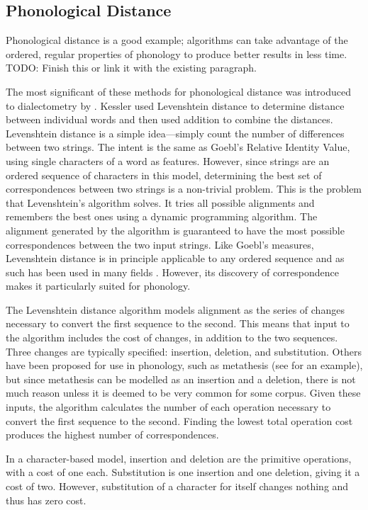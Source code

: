 \documentclass[11pt]{article}
\begin{document}
\subsection{Phonological Distance}

Phonological distance is a good example; algorithms can take advantage
of the ordered, regular properties of phonology to produce better
results in less time. TODO: Finish this or link it with the existing
paragraph.

The most significant of these methods for phonological distance was
introduced to dialectometry by . Kessler used
Levenshtein distance \cite{lev65} to determine distance between
individual words and then used addition to combine the
distances.  Levenshtein distance is a simple idea---simply count the
number of differences between two strings. The intent is the same as
Goebl's Relative Identity Value, using single characters of a word as
features. However, since strings are an ordered sequence of characters
in this model, determining the best set of correspondences between two
strings is a non-trivial problem. This is the problem that
Levenshtein's algorithm solves. It tries all possible alignments and
remembers the best ones using a dynamic programming algorithm. The
alignment generated by the algorithm is guaranteed to have the most
possible correspondences between the two input strings. Like Goebl's
measures, Levenshtein distance is in principle applicable to any
ordered sequence and as such has been used in many fields
\cite{sankoff83}. However, its discovery of correspondence makes it
particularly suited for phonology.

The Levenshtein distance algorithm models alignment
as the series of changes necessary to convert the first sequence to
the second. This means that input to the algorithm includes the cost
of changes, in addition to the two sequences. Three changes are
typically specified: insertion, deletion, and substitution. Others have
been proposed for use in phonology,
such as metathesis (see \cite{kondrak02} for an
example), but since metathesis can be modelled as an insertion and a
deletion, there is not much reason unless it is deemed to be very
common for some corpus.
Given these inputs, the algorithm calculates the number of each
operation necessary to convert the first sequence to the
second. Finding the lowest total operation cost produces the highest number of
correspondences.

In a character-based model, insertion and deletion are the primitive operations,
with a cost of one each. Substitution is one insertion and one
deletion, giving it a cost of two. However, substitution of a character
for itself changes nothing and thus has zero cost.
\end{document}
